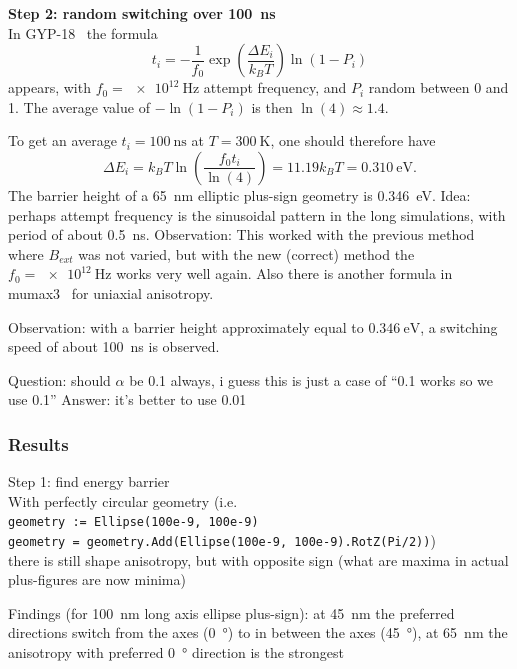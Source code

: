 \documentclass[10pt,a4paper]{article}
\newcommand{\code}[1]{\texttt{#1}}
\begin{document}
\textbf{Step 2: random switching over \SI{100}{\nano\second}} \\
In GYP-18~\cite{GYP-18} the formula
\begin{equation}
    t_i = -\frac{1}{f_0} \exp(\frac{\Delta E_i}{k_B T}) \ln(1-P_i)
    \label{eq:Switching_time}
\end{equation}
appears, with $f_0 = \SI{e12}{\hertz}$ attempt frequency, and $P_i$ random between 0 and 1. The average value of $-\ln(1-P_i)$ is then $\ln(4) \approx 1.4$.

To get an average $t_i = \SI{100}{\nano\second}$ at $T=\SI{300}{\kelvin}$, one should therefore have
\begin{equation}
    \Delta E_i = k_B T \ln(\frac{f_0 t_i}{\ln(4)}) = 11.19 k_B T = \SI{0.310}{\electronvolt} \mathrm{.}
\end{equation}
The barrier height of a \SI{65}{\nano\metre} elliptic plus-sign geometry is \SI{0.346}{\electronvolt}.
Idea: perhaps attempt frequency is the sinusoidal pattern in the long simulations, with period of about \SI{0.5}{\nano\second}. Observation: This worked with the previous method where $B_{ext}$ was not varied, but with the new (correct) method the $f_0 = \SI{e12}{\hertz}$ works very well again.
Also there is another formula in mumax3~\cite{MuMax3} for uniaxial anisotropy.

Observation: with a barrier height approximately equal to $\SI{0.346}{\electronvolt}$, a switching speed of about \SI{100}{\nano\second} is observed.

Question: should $\alpha$ be 0.1 always, i guess this is just a case of ``0.1 works so we use 0.1''
Answer: it's better to use 0.01

\subsubsection{Results}
Step 1: find energy barrier \\
With perfectly circular geometry (i.e. \\
\code{geometry := Ellipse(100e-9, 100e-9)} \\
\code{geometry = geometry.Add(Ellipse(100e-9, 100e-9).RotZ(Pi/2))}) \\
there is still shape anisotropy, but with opposite sign (what are maxima in actual plus-figures are now minima)

Findings (for \SI{100}{\nano\metre} long axis ellipse plus-sign):
at \SI{45}{\nano\metre} the preferred directions switch from the axes (\SI{0}{\degree}) to in between the axes (\SI{45}{\degree}),
at \SI{65}{\nano\metre} the anisotropy with preferred \SI{0}{\degree} direction is the strongest
\end{document}
